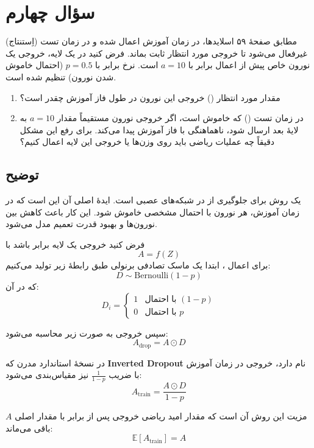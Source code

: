 \documentclass{article}
\begin{document}
\section{سؤال چهارم}

مطابق صفحهٔ ۵۹ اسلایدها،  در زمان آموزش اعمال شده و در زمان تست (اِستنتاج) غیرفعال می‌شود تا خروجی مورد انتظار ثابت بماند. فرض کنید در یک لایه، خروجی یک نورون خاص پیش از اعمال  برابر با 
$a = 10$
است. نرخ  برابر با 
$p = 0.5$
(احتمال خاموش شدن نورون) تنظیم شده است.

\begin{enumerate}
	\item[(الف)] مقدار مورد انتظار () خروجی این نورون در طول فاز آموزش چقدر است؟
	\item[(ب)] در زمان تست () که  خاموش است، اگر خروجی نورون مستقیماً مقدار 
	$a = 10$
	به لایهٔ بعد ارسال شود، ناهماهنگی با فاز آموزش پیدا می‌کند. برای رفع این مشکل دقیقاً چه عملیات ریاضی باید روی وزن‌ها یا خروجی این لایه اعمال کنیم؟
\end{enumerate}


\subsection{توضیح }

 یک روش  برای جلوگیری از  در شبکه‌های عصبی است. ایدهٔ اصلی آن این است که در زمان آموزش، هر نورون با احتمال مشخصی خاموش شود. این کار باعث کاهش  بین نورون‌ها و بهبود قدرت تعمیم مدل می‌شود.

فرض کنید خروجی یک لایه برابر باشد با
\[
A = f(Z)
\]
برای اعمال ، ابتدا یک ماسک تصادفی برنولی طبق رابطهٔ زیر تولید می‌کنیم:
\[
D \sim \text{Bernoulli}(1-p)
\]
که در آن:
\[
D_i =
\begin{cases}
	1 & \text{با احتمال } (1-p) \\
	0 & \text{با احتمال } p
\end{cases}
\]

سپس خروجی  به صورت زیر محاسبه می‌شود:
\[
A_{\text{drop}} = A \odot D
\]

در نسخهٔ استاندارد مدرن که \textbf{Inverted Dropout} نام دارد، خروجی در زمان آموزش با ضریب
$\frac{1}{1-p}$
نیز مقیاس‌بندی می‌شود:
\[
A_{\text{train}} = \frac{A \odot D}{1-p}
\]

مزیت این روش آن است که مقدار امید ریاضی خروجی پس از  برابر با مقدار اصلی $A$ باقی می‌ماند:
\[
\mathbb{E}[A_{\text{train}}] = A
\]
\end{document}
